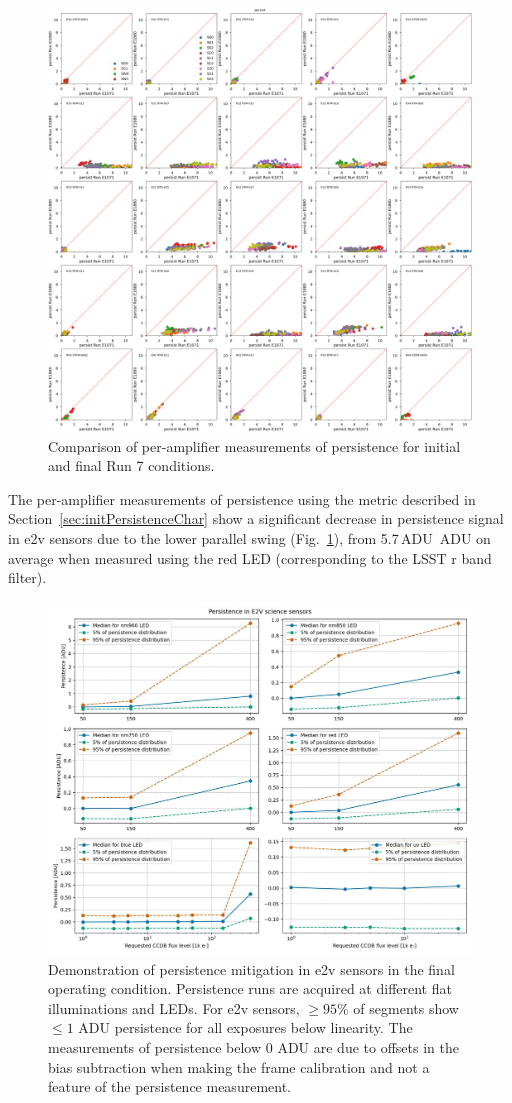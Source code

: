 \begin{figure}[ht]
    \centering
    \includegraphics[width=0.7\linewidth]{figures/finalCharacterization/E1071_E1880_persist_inset.png}
    \caption{Comparison of per-amplifier measurements of persistence for initial and final Run 7 conditions.}
    \label{fig:finalChar-Persist-5x5}
\end{figure}

The per-amplifier measurements of persistence using the metric described in Section~\ref{sec:initPersistenceChar} show a significant decrease in persistence signal in e2v sensors due to the lower parallel swing (Fig.~\ref{fig:finalChar-Persist-5x5}), from 5.7\,ADU \,ADU on average when measured using the red LED (corresponding to the LSST r band filter).

\begin{figure}[ht]
    \centering
    \includegraphics[width=0.7\linewidth]{figures/PersistenceE2V.jpg}
    \caption{Demonstration of persistence mitigation in e2v sensors in the final operating condition. Persistence runs are acquired at different flat illuminations and LEDs. For e2v sensors, $\geq95\%$ of segments show $\leq1$ ADU persistence for all exposures below linearity. The measurements of persistence below 0 ADU are due to offsets in the bias subtraction when making the frame calibration and not a feature of the persistence measurement.}
    \label{fig:finalChar-persistenceAllLEDs}
\end{figure}

